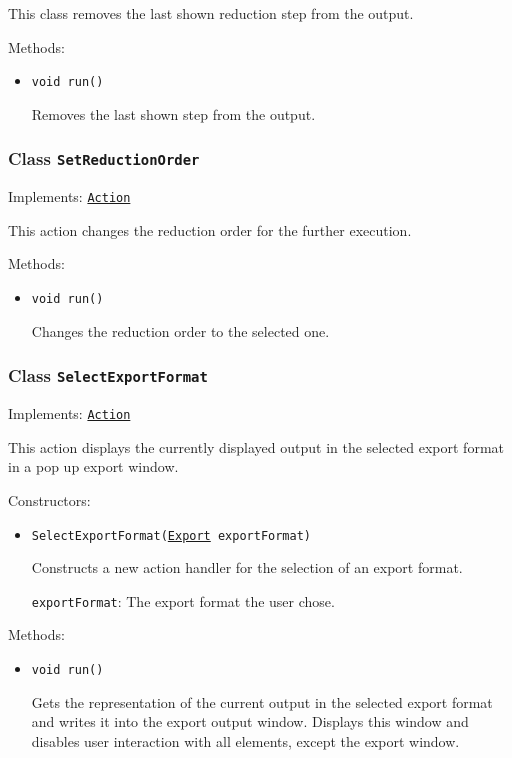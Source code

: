 This class removes the last shown reduction step from the output.

Methods:
\begin{itemize}
\item \texttt{void run()}

Removes the last shown step from the output.

\end{itemize}

\subsubsection{Class \texttt{SetReductionOrder}}
\label{type:edu.kit.wavelength.client.view.action.SetReductionOrder}
Implements: \texttt{\hyperref[type:edu.kit.wavelength.client.view.action.Action]{Action}}

This action changes the reduction order for the further execution.

Methods:
\begin{itemize}
\item \texttt{void run()}

Changes the reduction order to the selected one.

\end{itemize}

\subsubsection{Class \texttt{SelectExportFormat}}
\label{type:edu.kit.wavelength.client.view.action.SelectExportFormat}
Implements: \texttt{\hyperref[type:edu.kit.wavelength.client.view.action.Action]{Action}}

This action displays the currently displayed output in the selected export
 format in a pop up export window.

Constructors:
\begin{itemize}
\item \texttt{SelectExportFormat(\hyperref[type:edu.kit.wavelength.client.view.export.Export]{Export} exportFormat)}

Constructs a new action handler for the selection of an export format.

\texttt{exportFormat}: The export format the user chose.

\end{itemize}

Methods:
\begin{itemize}
\item \texttt{void run()}

Gets the representation of the current output in the selected export format
 and writes it into the export output window. Displays this window and disables
 user interaction with all elements, except the export window.

\end{itemize}

